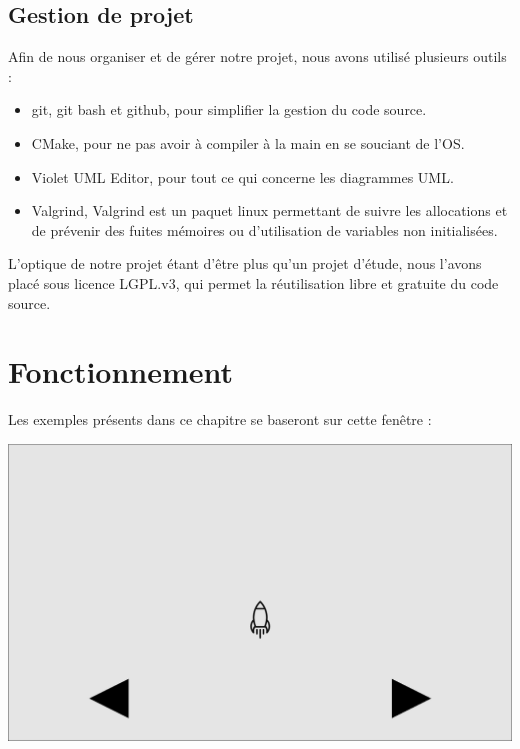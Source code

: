 \documentclass[a4paper]{report}
\begin{document}
    \section{Gestion de projet}

    Afin de nous organiser et de gérer notre projet, nous avons utilisé plusieurs outils :
\begin{itemize}
    \item git, git bash et github, pour simplifier la gestion du code source.
    \item CMake, pour ne pas avoir à compiler à la main en se souciant de l'OS.
    \item Violet UML Editor, pour tout ce qui concerne les diagrammes UML.
    \item Valgrind, Valgrind est un paquet linux permettant de suivre les allocations et de prévenir des fuites mémoires ou
    d'utilisation de variables non initialisées.
\end{itemize}

    \vspace{5mm}

    L'optique de notre projet étant d'être plus qu'un projet d'étude, nous l'avons placé sous licence LGPL.v3, qui
    permet la réutilisation libre et gratuite du code source.

\chapter{Fonctionnement}

    Les exemples présents dans ce chapitre se baseront sur cette fenêtre :
\begin{center}
    \includegraphics[scale=0.3]{Analyse/Capture.png}
\end{center}
\end{document}
